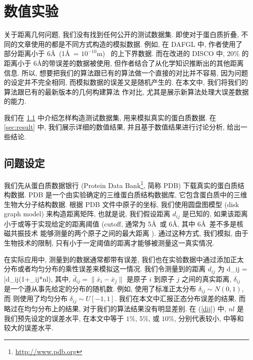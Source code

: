 \section{数值实验}
\label{sec:NumResult}
关于距离几何问题, 我们没有找到任何公开的测试数据集.
即使对于蛋白质折叠, 不同的文章使用的都是不同方式构造的模拟数据.
例如, 在 DAFGL \cite{Biswas2008} 中, 
作者使用了部分距离小于 6\AA ~(1\AA ~= $10^{-10}$m)~ 的上下界数据.
而在改进的 DISCO \cite{Fang2013} 中, 
20\% 的距离小于 6\AA 的带误差的数据被使用,
但作者结合了从化学知识推断出的其他距离信息.
所以, 想要把我们的算法跟已有的算法做一个直接的对比并不容易,
因为问题的设定并不完全相同, 而模拟数据的误差又是随机产生的.
在本文中, 我们将我们的算法跟已有的最新版本的几何构建算法 \cite{Sit2009} 作对比, 
尤其是展示新算法处理大误差数据的能力.

我们在 \ref{sec:ProbSet} 中介绍怎样构造测试数据集, 用来模拟真实的蛋白质数据.
在 \ref{sec:result} 中, 我们展示详细的数值结果, 
并且基于数值结果进行讨论分析, 给出一些结论.

\subsection{问题设定}
\label{sec:ProbSet}
我们先从蛋白质数据银行 (Protein Data Bank\footnote{\url{http://www.pdb.org}}, 
简称 PDB) \cite{Berman2000} 下载真实的蛋白质结构数据.
PDB 是一个由实验确定的三维蛋白质结构数据库, 
它包含蛋白质中的三维生物大分子结构数据.
根据 PDB 文件中原子的坐标, 我们使用圆盘图模型 (disk graph model) 来构造距离矩阵,
也就是说, 我们假设距离 $d_{ij}$ 是已知的, 
如果该距离小于或等于实现给定的距离阈值 
(cutoff, 通常为 5\AA ~或 6\AA, 其中 6\AA ~差不多是核磁共振技术
能够测量的两个原子之间的最大距离 \cite{Biswas2008}). 
通过这种方式, 我们模拟, 由于生物技术的限制,
只有小于一定阈值的距离才能够被测量这一真实情况.

在实际应用中, 测量到的数据通常都带有误差,
我们也在实验数据中通过添加正太分布或者均匀分布的乘性误差来模拟这一情况.
我们令测量到的距离 $d_{ij}$ 为
\be d_{ij} = \bar{d}_{ij}(1+\delta_{ij}*nl), \label{dij} \ee
其中, $\bar{d}_{ij}=\|\bar{x}_i-\bar{x}_j\|$ 是原子 $i$ 到原子 $j$ 之间的真实距离,
$\delta_{ij}$ 是一个遵从事先给定的分布的随机数.
例如, \cite{Biswas2008} 使用了标准正太分布 $\delta_{ij} \sim N(0,1)$,
而 \cite{Sit2009} 则使用了均匀分布 $\delta_{ij} \sim U[-1,1]$. 
我们在本文中汇报正态分布误差的结果, 
而略过在均匀分布上的结果, 对于我们的算法结果没有明显差别.
在 (\ref{dij}) 中,  $nl$ 是我们预先设定的误差水平,
在本文中等于 $1\%$, $5\%$, 或 $10\%$,
分别代表较小, 中等和较大的误差水平.

